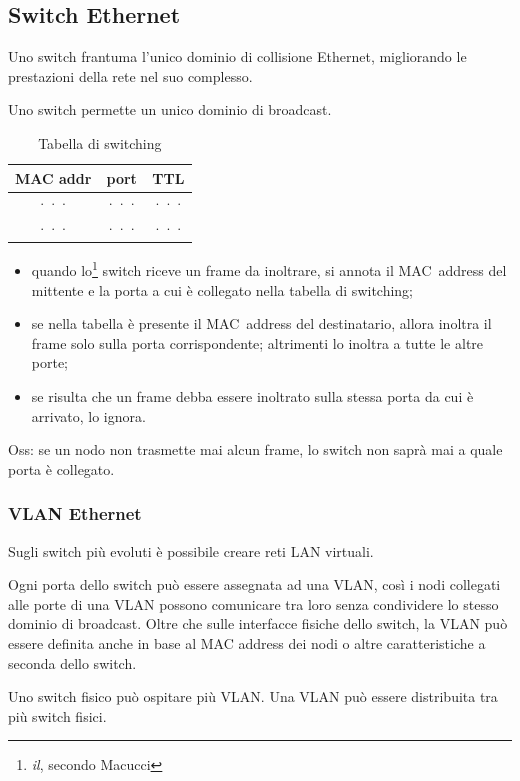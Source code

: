 \documentclass[12pt,a4paper]{article}
\begin{document}
\subsection{Switch Ethernet}
Uno switch frantuma l'unico dominio di collisione Ethernet, migliorando
le prestazioni della rete nel suo complesso.

Uno switch permette un unico dominio di broadcast.

\begin{table}[H]
  \centering
  \begin{tabular}{| c | c | c |}\hline
    MAC addr  & port  & TTL \\ \hline
    ···       & ···   & ··· \\ \hline
    ···       & ···   & ··· \\ \hline
  \end{tabular}
  \caption{Tabella di switching}
\end{table}

\begin{itemize}
  \item quando lo\footnote{\emph{il}, secondo Macucci} switch riceve un
    frame da inoltrare, si annota il MAC~address del mittente e la porta
    a cui è collegato nella tabella di switching;
  \item se nella tabella è presente il MAC~address del destinatario,
    allora inoltra il frame solo sulla porta corrispondente; altrimenti
    lo inoltra a tutte le altre porte;
  \item se risulta che un frame debba essere inoltrato sulla stessa
    porta da cui è arrivato, lo ignora.
\end{itemize}

Oss: se un nodo non trasmette mai alcun frame, lo switch non saprà mai
a quale porta è collegato.

\subsubsection{VLAN Ethernet}
Sugli switch più evoluti è possibile creare reti LAN virtuali.

Ogni porta dello switch può essere assegnata ad una VLAN, così i nodi
collegati alle porte di una VLAN possono comunicare tra loro senza
condividere lo stesso dominio di broadcast.
Oltre che sulle interfacce fisiche dello switch, la VLAN può essere
definita anche in base al MAC address dei nodi o altre caratteristiche
a seconda dello switch.

Uno switch fisico può ospitare più VLAN. Una VLAN può essere distribuita
tra più switch fisici.
\end{document}

